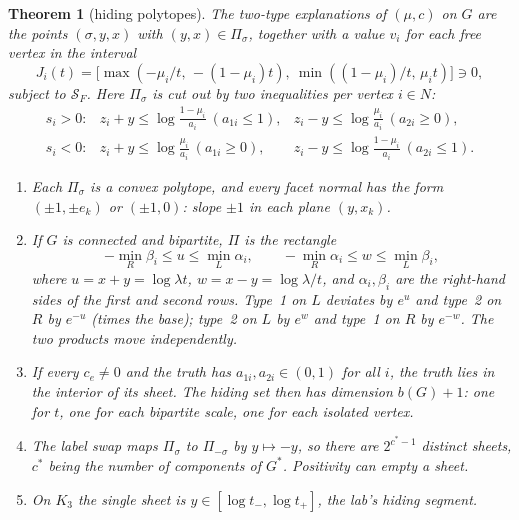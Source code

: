 \documentclass[11pt]{article}
\newtheorem{theorem}{Theorem}\newtheorem{proposition}[theorem]{Proposition}\newtheorem{lemma}[theorem]{Lemma}\newtheorem{corollary}[theorem]{Corollary}
\theoremstyle{definition}\newtheorem{definition}[theorem]{Definition}\newtheorem{remark}[theorem]{Remark}\newtheorem{example}[theorem]{Example}
\begin{document}
\begin{theorem}[hiding polytopes]\label{thm:hiding}
The two-type explanations of $(\mu,c)$ on $G$ are the points $(\sigma,y,x)$ with $(y,x)\in\Pi_\sigma$, together with a value $v_i$ for
each free vertex in the interval
\[
J_i(t)=\bigl[\max(-\mu_i/t,\,-(1-\mu_i)t),\ \min((1-\mu_i)/t,\,\mu_i t)\bigr]\ni0 ,
\]
subject to $\mathcal S_F$. Here $\Pi_\sigma$ is cut out by two inequalities per vertex $i\in N$:
\[
\begin{array}{lll}
s_i>0: & z_i+y\le\log\frac{1-\mu_i}{a_i}\ (a_{1i}\le1), & z_i-y\le\log\frac{\mu_i}{a_i}\ (a_{2i}\ge0),\\[3pt]
s_i<0: & z_i+y\le\log\frac{\mu_i}{a_i}\ (a_{1i}\ge0), & z_i-y\le\log\frac{1-\mu_i}{a_i}\ (a_{2i}\le1).
\end{array}
\]
\begin{enumerate}
\item[(1)] Each $\Pi_\sigma$ is a convex polytope, and every facet normal has the form $(\pm1,\pm e_k)$ or $(\pm1,0)$: slope $\pm1$ in
  each plane $(y,x_k)$.
\item[(2)] If $G$ is connected and bipartite, $\Pi$ is the rectangle
\[
-\min_{R}\beta_i\le u\le\min_L\alpha_i,\qquad -\min_R\alpha_i\le w\le\min_L\beta_i,
\]
  where $u=x+y=\log\lambda t$, $w=x-y=\log\lambda/t$, and $\alpha_i,\beta_i$ are the right-hand sides of the first and second rows.
  Type~1 on $L$ deviates by $e^{u}$ and type~2 on $R$ by $e^{-u}$ (times the base); type~2 on $L$ by $e^{w}$ and type~1 on $R$ by
  $e^{-w}$. The two products move independently.
\item[(3)] If every $c_e\ne0$ and the truth has $a_{1i},a_{2i}\in(0,1)$ for all $i$, the truth lies in the interior of its sheet. The
  hiding set then has dimension $b(G)+1$: one for $t$, one for each bipartite scale, one for each isolated vertex.
\item[(4)] The label swap maps $\Pi_\sigma$ to $\Pi_{-\sigma}$ by $y\mapsto-y$, so there are $2^{c^*-1}$ distinct sheets, $c^*$ being
  the number of components of $G^*$. Positivity can empty a sheet.
\item[(5)] On $K_3$ the single sheet is $y\in[\log t_-,\log t_+]$, the lab's hiding segment.
\end{enumerate}
\end{theorem}
\end{document}
